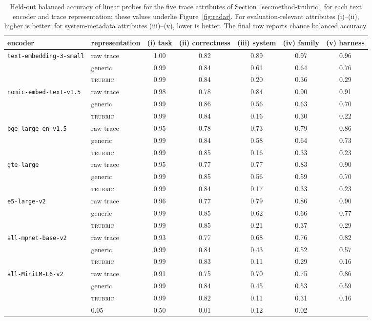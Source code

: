 \documentclass{article}
\newcommand{\trubric}{\textsc{trubric}}
\begin{document}
\begin{table}[t]
\centering
\caption{Held-out balanced accuracy of linear probes for the five trace attributes of Section~\ref{sec:method-trubric}, for each text encoder and trace representation; these values underlie Figure~\ref{fig:radar}. For evaluation-relevant attributes (i)--(ii), higher is better; for system-metadata attributes (iii)--(v), lower is better. The final row reports chance balanced accuracy.}
\label{tab:probes}
\tiny
\begin{tabular}{llccccc}
\toprule
encoder & representation & {(i) task} & {(ii) correctness} & {(iii) system} & {(iv) family} & {(v) harness} \\
\midrule
\texttt{text-embedding-3-small} & raw trace & 1.00 & 0.82 & 0.89 & 0.97 & 0.96 \\
 & generic & 0.99 & 0.84 & 0.61 & 0.64 & 0.76 \\
 & \trubric{} & 0.99 & 0.84 & 0.20 & 0.36 & 0.29 \\
\addlinespace[2pt]
\texttt{nomic-embed-text-v1.5} & raw trace & 0.98 & 0.78 & 0.84 & 0.90 & 0.91 \\
 & generic & 0.99 & 0.86 & 0.56 & 0.63 & 0.70 \\
 & \trubric{} & 0.99 & 0.84 & 0.16 & 0.30 & 0.22 \\
\addlinespace[2pt]
\texttt{bge-large-en-v1.5} & raw trace & 0.95 & 0.78 & 0.73 & 0.79 & 0.86 \\
 & generic & 0.99 & 0.84 & 0.58 & 0.64 & 0.73 \\
 & \trubric{} & 0.99 & 0.85 & 0.16 & 0.33 & 0.23 \\
\addlinespace[2pt]
\texttt{gte-large} & raw trace & 0.95 & 0.77 & 0.77 & 0.83 & 0.90 \\
 & generic & 0.99 & 0.85 & 0.56 & 0.59 & 0.70 \\
 & \trubric{} & 0.99 & 0.84 & 0.17 & 0.33 & 0.23 \\
\addlinespace[2pt]
\texttt{e5-large-v2} & raw trace & 0.96 & 0.77 & 0.79 & 0.86 & 0.90 \\
 & generic & 0.99 & 0.85 & 0.62 & 0.66 & 0.77 \\
 & \trubric{} & 0.99 & 0.85 & 0.21 & 0.37 & 0.29 \\
\addlinespace[2pt]
\texttt{all-mpnet-base-v2} & raw trace & 0.93 & 0.77 & 0.68 & 0.76 & 0.82 \\
 & generic & 0.99 & 0.84 & 0.43 & 0.52 & 0.57 \\
 & \trubric{} & 0.99 & 0.83 & 0.11 & 0.29 & 0.16 \\
\addlinespace[2pt]
\texttt{all-MiniLM-L6-v2} & raw trace & 0.91 & 0.75 & 0.70 & 0.75 & 0.86 \\
 & generic & 0.99 & 0.84 & 0.45 & 0.53 & 0.59 \\
 & \trubric{} & 0.99 & 0.82 & 0.11 & 0.31 & 0.16 \\
\addlinespace[2pt]
\midrule
\multicolumn{2}{l}{chance} & 0.05 & 0.50 & 0.01 & 0.12 & 0.02 \\
\bottomrule
\end{tabular}
\end{table}
\end{document}

